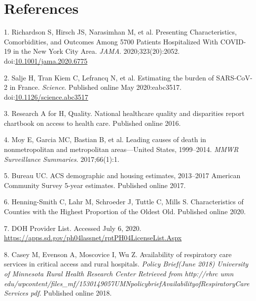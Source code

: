 \documentclass[
]{article}
\begin{document}
\hypertarget{references}{%
\section{References}\label{references}}

\hypertarget{refs}{}
\leavevmode\hypertarget{ref-richardson_presenting_2020}{}%
1. Richardson S, Hirsch JS, Narasimhan M, et al. Presenting Characteristics, Comorbidities, and Outcomes Among 5700 Patients Hospitalized With COVID-19 in the New York City Area. \emph{JAMA}. 2020;323(20):2052. doi:\href{https://doi.org/10.1001/jama.2020.6775}{10.1001/jama.2020.6775}

\leavevmode\hypertarget{ref-salje_estimating_2020}{}%
2. Salje H, Tran Kiem C, Lefrancq N, et al. Estimating the burden of SARS-CoV-2 in France. \emph{Science}. Published online May 2020:eabc3517. doi:\href{https://doi.org/10.1126/science.abc3517}{10.1126/science.abc3517}

\leavevmode\hypertarget{ref-research_national_2016}{}%
3. Research A for H, Quality. National healthcare quality and disparities report chartbook on access to health care. Published online 2016.

\leavevmode\hypertarget{ref-moy_leading_2017}{}%
4. Moy E, Garcia MC, Bastian B, et al. Leading causes of death in nonmetropolitan and metropolitan areas---United States, 1999--2014. \emph{MMWR Surveillance Summaries}. 2017;66(1):1.

\leavevmode\hypertarget{ref-bureau_acs_2017}{}%
5. Bureau UC. ACS demographic and housing estimates, 2013--2017 American Community Survey 5-year estimates. Published online 2017.

\leavevmode\hypertarget{ref-henning-smith_characteristics_2020}{}%
6. Henning-Smith C, Lahr M, Schroeder J, Tuttle C, Mills S. Characteristics of Counties with the Highest Proportion of the Oldest Old. Published online 2020.

\leavevmode\hypertarget{ref-noauthor_doh_nodate}{}%
7. DOH Provider List. Accessed July 6, 2020. \url{https://apps.sd.gov/ph04lassnet/rptPH04LicenseList.Aspx}

\leavevmode\hypertarget{ref-casey_availability_2018}{}%
8. Casey M, Evenson A, Moscovice I, Wu Z. Availability of respiratory care services in critical access and rural hospitals. \emph{Policy Brief(June 2018) University of Minnesota Rural Health Research Center Retrieved from http://rhrc umn edu/wpcontent/files\_mf/1530149057UMNpolicybriefAvailabilityofRespiratoryCareServices pdf}. Published online 2018.
\end{document}
